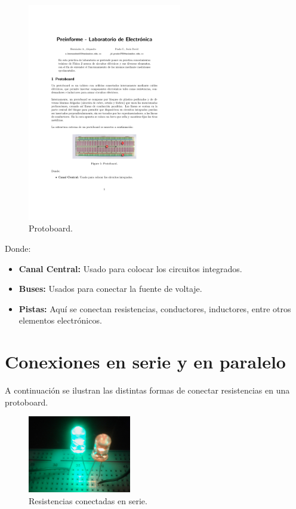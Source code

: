 \documentclass[12pt]{article}
\begin{document}
\begin{figure}[h!]
	\centering
	\includegraphics[width=0.6\textwidth]{protoboard}
	\caption{Protoboard.}
\end{figure}

Donde:

\begin{itemize}
	\item \textbf{Canal Central:} Usado para colocar los circuitos integrados. 
	\item \textbf{Buses:} Usados para conectar la fuente de voltaje.
	\item \textbf{Pistas:} Aquí se conectan resistencias, conductores, inductores, entre otros elementos electrónicos.

\end{itemize}

\section{Conexiones en serie y en paralelo}

A continuación se ilustran las distintas formas de conectar resistencias en una protoboard.
\\

\begin{figure}[h!]
	\centering
	\includegraphics[width=0.4\textwidth,height=0.17\textheight]{serie}
	\caption{Resistencias conectadas en serie.}
\end{figure}
\end{document}
